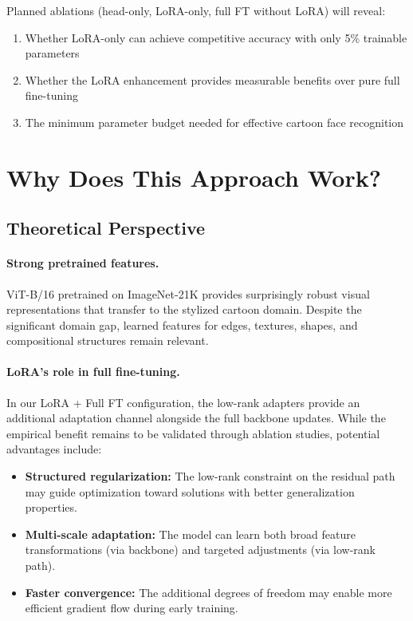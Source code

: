 \documentclass[11pt]{article}
\begin{document}
Planned ablations (head-only, LoRA-only, full FT without LoRA) will reveal:
\begin{enumerate}
    \item Whether LoRA-only can achieve competitive accuracy with only 5\% trainable parameters
    \item Whether the LoRA enhancement provides measurable benefits over pure full fine-tuning
    \item The minimum parameter budget needed for effective cartoon face recognition
\end{enumerate}

\section{Why Does This Approach Work?}

\subsection{Theoretical Perspective}

\paragraph{Strong pretrained features.}
ViT-B/16 pretrained on ImageNet-21K provides surprisingly robust visual representations that transfer to the stylized cartoon domain. Despite the significant domain gap, learned features for edges, textures, shapes, and compositional structures remain relevant.

\paragraph{LoRA's role in full fine-tuning.}
In our LoRA + Full FT configuration, the low-rank adapters provide an additional adaptation channel alongside the full backbone updates. While the empirical benefit remains to be validated through ablation studies, potential advantages include:
\begin{itemize}
    \item \textbf{Structured regularization:} The low-rank constraint on the residual path may guide optimization toward solutions with better generalization properties.
    \item \textbf{Multi-scale adaptation:} The model can learn both broad feature transformations (via backbone) and targeted adjustments (via low-rank path).
    \item \textbf{Faster convergence:} The additional degrees of freedom may enable more efficient gradient flow during early training.
\end{itemize}
\end{document}
